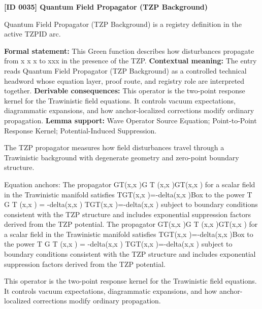 \clearpage
\noindent\textbf{[ID 0035] Quantum Field Propagator (TZP Background)}\par
\vspace{0.35em}
\begingroup\small
{}
Quantum Field Propagator (TZP Background) is a registry definition in the active TZPID arc.

\begingroup\footnotesize\setlength{\emergencystretch}{3em}\sloppy
\textbf{Formal statement:} This Green function describes how disturbances propagate from x x x  to xxx in the presence of the TZP. \textbf{Contextual meaning:} The entry reads Quantum Field Propagator (TZP Background) as a controlled technical headword whose equation layer, proof route, and registry role are interpreted together. \textbf{Derivable consequences:} This operator is the two-point response kernel for the Trawinistic field equations. It controls vacuum expectations, diagrammatic expansions, and how anchor-localized corrections modify ordinary propagation. \textbf{Lemma support:} Wave Operator Source Equation; Point-to-Point Response Kernel; Potential-Induced Suppression.\par
\endgroup

The TZP propagator measures how field disturbances travel through a Trawinistic background with degenerate geometry and zero-point boundary structure.

Equation anchors: The propagator GT(x,x )G T (x,x )GT(x,x ) for a scalar field in the Trawinistic manifold satisfies  TGT(x,x )=-delta(x,x )Box to the power T G T (x,x ) = -delta(x,x ) TGT(x,x )=-delta(x,x ) subject to boundary conditions consistent with the TZP structure and includes exponential suppression factors derived from the TZP potential. The propagator GT(x,x )G T (x,x )GT(x,x ) for a scalar field in the Trawinistic manifold satisfies  TGT(x,x )=-delta(x,x )Box to the power T G T (x,x ) = -delta(x,x ) TGT(x,x )=-delta(x,x ) subject to boundary conditions consistent with the TZP structure and includes exponential suppression factors derived from the TZP potential.

This operator is the two-point response kernel for the Trawinistic field equations. It controls vacuum expectations, diagrammatic expansions, and how anchor-localized corrections modify ordinary propagation.
\endgroup

